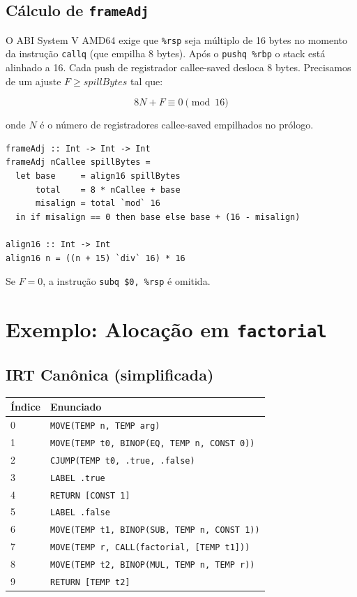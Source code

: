 \subsection{Cálculo de \texttt{frameAdj}}

O ABI System V AMD64 exige que \texttt{\%rsp} seja múltiplo de 16 bytes
no momento da instrução \texttt{callq} (que empilha 8 bytes). Após o
\texttt{pushq \%rbp} o stack está alinhado a 16. Cada push de registrador
callee-saved desloca 8 bytes. Precisamos de um ajuste $F \geq
\mathit{spillBytes}$
tal que:

\[
  8N + F \equiv 0 \pmod{16}
\]

onde $N$ é o número de registradores callee-saved empilhados no prólogo.

\begin{verbatim}
frameAdj :: Int -> Int -> Int
frameAdj nCallee spillBytes =
  let base     = align16 spillBytes
      total    = 8 * nCallee + base
      misalign = total `mod` 16
  in if misalign == 0 then base else base + (16 - misalign)

align16 :: Int -> Int
align16 n = ((n + 15) `div` 16) * 16
\end{verbatim}

Se $F = 0$, a instrução \texttt{subq \$0, \%rsp} é omitida.

\section{Exemplo: Alocação em \texttt{factorial}}

\subsection{IRT Canônica (simplificada)}

\begin{center}
  \begin{tabular}{ll}
    \toprule
    Índice & Enunciado \\
    \midrule
    0 & \texttt{MOVE(TEMP n, TEMP arg)} \\
    1 & \texttt{MOVE(TEMP t0, BINOP(EQ, TEMP n, CONST 0))} \\
    2 & \texttt{CJUMP(TEMP t0, .true, .false)} \\
    3 & \texttt{LABEL .true} \\
    4 & \texttt{RETURN [CONST 1]} \\
    5 & \texttt{LABEL .false} \\
    6 & \texttt{MOVE(TEMP t1, BINOP(SUB, TEMP n, CONST 1))} \\
    7 & \texttt{MOVE(TEMP r, CALL(factorial, [TEMP t1]))} \\
    8 & \texttt{MOVE(TEMP t2, BINOP(MUL, TEMP n, TEMP r))} \\
    9 & \texttt{RETURN [TEMP t2]} \\
    \bottomrule
  \end{tabular}
\end{center}

